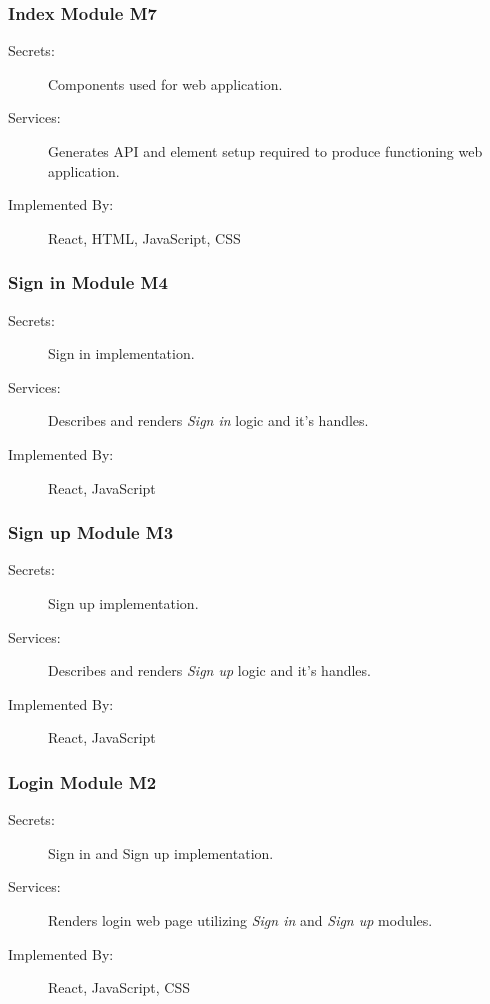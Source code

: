 \documentclass[12pt, titlepage]{article}
\begin{document}
\subsubsection{Index Module M7}

\begin{description}
\item[Secrets:]Components used for web application.
\item[Services:]Generates API and element setup required to produce functioning web application.
\item[Implemented By:] React, HTML, JavaScript, CSS
\end{description}

\subsubsection{Sign in Module M4}
\begin{description}
\item[Secrets:]Sign in implementation.
\item[Services:]Describes and renders \textit{Sign in} logic and it's handles.
\item[Implemented By:] React, JavaScript
\end{description}

\subsubsection{Sign up Module M3}
\begin{description}
\item[Secrets:]Sign up implementation.
\item[Services:]Describes and renders \textit{Sign up} logic and it's handles.
\item[Implemented By:] React, JavaScript
\end{description}

\subsubsection{Login Module M2}
\begin{description}
\item[Secrets:]Sign in and Sign up implementation.
\item[Services:]Renders login web page utilizing \textit{Sign in} and \textit{Sign up} modules.
\item[Implemented By:] React, JavaScript, CSS
\end{description}
\end{document}
